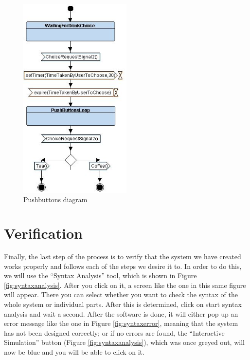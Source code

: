 \documentclass[12pt]{article}
\begin{document}
\begin{figure}[htbp]
\centering
\includegraphics[width=0.5\textwidth]{fig/pushdiagram.jpg}
\caption{Pushbuttons diagram} \label{fig:pushbuttondiagram}
\end{figure}

\section{Verification}
	Finally, the last step of the process is to verify that the system we have created works properly and follows each of the steps we desire it to. In order to do this, we will use the “Syntax Analysis” tool, which is shown in Figure \ref{fig:syntaxanalysis}. After you click on it, a screen like the one in this same figure will appear. There you can select whether you want to check the syntax of the whole system or individual parts. After this is determined, click on start syntax analysis and wait a second. After the software is done, it will either pop up an error message like the one in Figure \ref{fig:syntaxerror}, meaning that the system has not been designed correctly; or if no errors are found, the “Interactive Simulation” button (Figure \ref{fig:syntaxanalysis}), which was once greyed out, will now be blue and you will be able to click on it.
\end{document}

